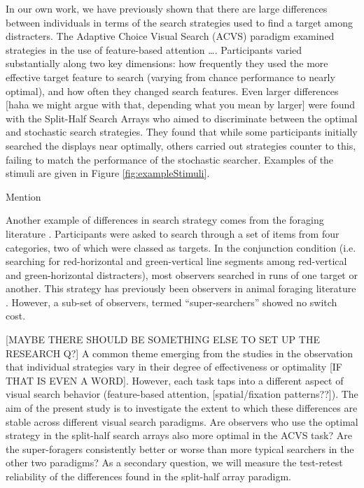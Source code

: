 \documentclass[]{rsos}%
\begin{document}
\begin{fmtext}
In our own work, we have previously shown that there are large differences between individuals in terms of the search strategies used to find a target among distracters. The Adaptive Choice Visual Search (ACVS) paradigm  \cite{irons-leber2016} examined strategies in the use of feature-based attention\cite{irons-leber2016,irons-leber2018} \ldots. Participants varied substantially along two key dimensions: how frequently they used the more effective target feature to search (varying from chance performance to nearly optimal), and how often they changed search features. Even larger differences [haha we might argue with that, depending what you mean by larger] were found with the Split-Half Search Arrays \cite{nowakowsak2017} who aimed to discriminate between the optimal  \cite{najemnik-geisler2008} and stochastic \cite{clarke2016} search strategies. They found that while some participants initially searched the displays near optimally, others carried out strategies counter to this, failing to match the performance of the stochastic searcher. Examples of the stimuli are given in Figure \ref{fig:exampleStimuli}. 


\end{fmtext}

\maketitle

Mention \cite{amor2017}

Another example of differences in search strategy comes from the foraging literature \cite{kristjansson2014,johannesson2016}. Participants were asked to search through a set of items from four categories, two of which were classed as targets. In the conjunction condition (i.e. searching for red-horizontal and green-vertical line segments among red-vertical and green-horizontal distracters), most observers searched in runs of one target or another. This strategy has previously been observers in animal foraging literature \cite{dawkins1971}. However, a sub-set of observers, termed ``super-searchers'' showed no switch cost. 

[MAYBE THERE SHOULD BE SOMETHING ELSE TO SET UP THE RESEARCH Q?] A common theme emerging from the studies in the observation that individual strategies vary in their degree of effectiveness or optimality [IF THAT IS EVEN A WORD]. However, each task taps into a different aspect of visual search behavior (feature-based attention, [spatial/fixation patterns??]). The aim of the present study is to investigate the extent to which these differences are stable across different visual search paradigms. Are observers who use the optimal strategy in the split-half search arrays also more optimal in the ACVS task? Are the super-foragers consistently better or worse than more typical searchers in the other two paradigms? As a secondary question, we will measure the test-retest reliability of the differences found in the split-half array paradigm. 
\end{document}
